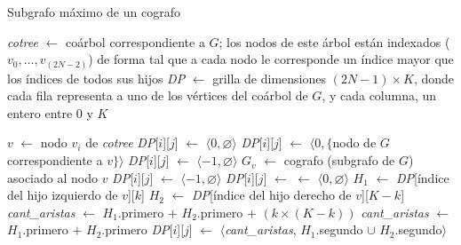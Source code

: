 \bigskip
\begin{algorithm}[H]
    \SetAlgoVlined
    \caption{Subgrafo máximo de un cografo}
    \label{alg:ex3:dp}

    \textit{cotree} $\gets$ coárbol correspondiente a $G$; los nodos de este árbol
    están indexados ($v_0, \dots, v_{(2N-2)}$) de forma tal que a cada nodo le
    corresponde un índice mayor que los índices de todos sus hijos \;
    \textit{DP} $\gets$ grilla de dimensiones $(2N - 1) \times K$,
    donde cada fila representa a uno de los vértices del coárbol de $G$, y
    cada columna, un entero entre $0$ y $K$ \;

     {
        $v$ $\gets$ nodo $v_i$ de \textit{cotree} \;
         {
             {
                \textit{DP}[$i$][$j$] $\gets$ $\langle 0, \varnothing \rangle$ \;
            } {
                 {
                     {
                        \textit{DP}[$i$][$j$] $\gets$ $\langle 0,
                        \lbrace$nodo de $G$ correspondiente a $v \rbrace \rangle$ \;
                    } {
                        \textit{DP}[$i$][$j$] $\gets$ $\langle -1, \varnothing \rangle$ \;
                    }
                } {
                    $G_v$ $\gets$ cografo (subgrafo de $G$) asociado al nodo $v$ \;
                     {
                        \textit{DP}[$i$][$j$] $\gets$ $\langle -1, \varnothing \rangle$ \;
                    } {
                        \textit{DP}[$i$][$j$] $\gets$ $\gets$ $\langle 0, \varnothing \rangle$ \;
                         {
                            $H_1$ $\gets$ \textit{DP}[índice del hijo izquierdo de $v$][$k$] \;
                            $H_2$ $\gets$ \textit{DP}[índice del hijo derecho de $v$][$K-k$] \;
                             {
                                 {
                                    \textit{cant\_aristas} $\gets$ $H_1$.primero $+$
                                        $H_2$.primero $+$ $(k \times (K - k))$ \;
                                } {
                                    \textit{cant\_aristas} $\gets$ $H_1$.primero $+$
                                        $H_2$.primero \;
                                }
                            }
                             {
                                \textit{DP}[$i$][$j$] $\gets$ $\langle$\textit{cant\_aristas},
                                    $H_1$.segundo $\cup$ $H_2$.segundo$\rangle$ \;
                            }
                        }
                    }
                }
            }
        }
    }
\end{algorithm}
\bigskip

